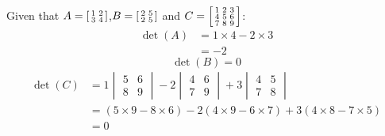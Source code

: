 \begin{example}
  Given that \footnotemark \(A=\begin{bsmallmatrix}
    1 & 2 \\
    3 & 4
  \end{bsmallmatrix} \),\(B=\begin{bsmallmatrix}
    2 & 5 \\
    2 & 5
  \end{bsmallmatrix} \) and \(C=\begin{bsmallmatrix}
    1 & 2 & 3 \\
    4 & 5 & 6 \\
    7 & 8 & 9
  \end{bsmallmatrix} \):
  \begin{align*}
    \det(A) &= 1\times 4- 2 \times 3 \\
    &= -2
  \end{align*}
  \begin{equation}
    \det(B) = 0
    \label{exdetzero}
  \end{equation}
  \begin{align*}
    \det(C) &= 1 \begin{vmatrix}
      5 & 6 \\
      8 & 9
    \end{vmatrix} - 2 \begin{vmatrix}
      4 & 6 \\
      7 & 9
    \end{vmatrix} + 3 \begin{vmatrix}
      4 & 5 \\
      7 & 8
    \end{vmatrix} \\
    &= (5\times 9 - 8 \times 6) -2(4 \times 9 - 6 \times 7) + 3(4 \times 8 - 7 \times 5) \\
    &= 0
  \end{align*}
\end{example}

